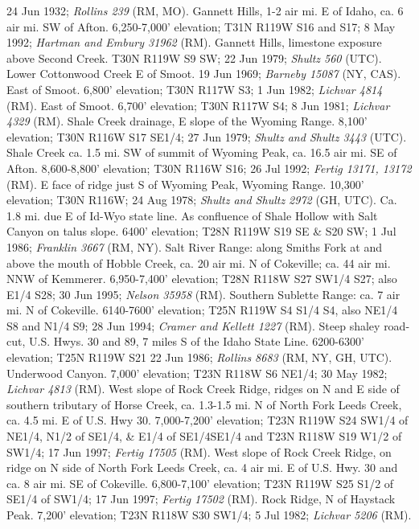 24 Jun 1932; \textit{Rollins 239} (RM, MO).
Gannett Hills, 1-2 air mi. E of Idaho, ca. 6 air mi. SW of Afton.
6,250-7,000' elevation; T31N R119W S16 and S17; 8 May 1992;
\textit{Hartman and Embury 31962} (RM).
Gannett Hills, limestone exposure above Second Creek. T30N R119W S9 SW;
22 Jun 1979; \textit{Shultz 560} (UTC).
Lower Cottonwood Creek E of Smoot. 19 Jun 1969;
\textit{Barneby 15087} (NY, CAS).
East of Smoot. 6,800' elevation; T30N R117W S3; 1 Jun 1982;
\textit{Lichvar 4814} (RM).
East of Smoot. 6,700' elevation; T30N R117W S4; 8 Jun 1981;
\textit{Lichvar 4329} (RM).
Shale Creek drainage, E slope of the Wyoming Range. 8,100' elevation;
T30N R116W S17 SE1/4; 27 Jun 1979; \textit{Shultz and Shultz 3443} (UTC).
Shale Creek ca. 1.5 mi. SW of summit of Wyoming Peak, ca. 16.5 air mi. SE of
Afton. 8,600-8,800' elevation; T30N R116W S16; 26 Jul 1992;
\textit{Fertig 13171, 13172} (RM).
E face of ridge just S of Wyoming Peak, Wyoming Range. 10,300' elevation;
T30N R116W; 24 Aug 1978; \textit{Shultz and Shultz 2972} (GH, UTC).
Ca. 1.8 mi. due E of Id-Wyo state line. As confluence of Shale Hollow with
Salt Canyon on talus slope. 6400' elevation; T28N R119W S19 SE & S20 SW;
1 Jul 1986; \textit{Franklin 3667} (RM, NY).
Salt River Range: along Smiths Fork at and above the mouth of Hobble Creek,
ca. 20 air mi. N of Cokeville; ca. 44 air mi. NNW of Kemmerer.
6,950-7,400' elevation; T28N R118W S27 SW1/4 S27; also E1/4 S28; 30 Jun 1995;
\textit{Nelson 35958} (RM).
Southern Sublette Range: ca. 7 air mi. N of Cokeville. 6140-7600' elevation;
T25N R119W S4 S1/4 S4, also NE1/4 S8 and N1/4 S9; 28 Jun 1994;
\textit{Cramer and Kellett 1227} (RM).
Steep shaley road-cut, U.S. Hwys. 30 and 89, 7 miles S of the Idaho State Line.
6200-6300' elevation; T25N R119W S21 22 Jun 1986;
\textit{Rollins 8683} (RM, NY, GH, UTC).
Underwood Canyon. 7,000' elevation; T23N R118W S6 NE1/4; 30 May 1982;
\textit{Lichvar 4813} (RM).
West slope of Rock Creek Ridge, ridges on N and E side of southern tributary of
Horse Creek, ca. 1.3-1.5 mi. N of North Fork Leeds Creek, ca. 4.5 mi. E of U.S.
Hwy 30. 7,000-7,200' elevation; T23N R119W S24 SW1/4 of NE1/4, N1/2 of SE1/4, &
E1/4 of SE1/4SE1/4 and T23N R118W S19 W1/2 of SW1/4; 17 Jun 1997;
\textit{Fertig 17505} (RM).
West slope of Rock Creek Ridge, on ridge on N side of North Fork Leeds Creek,
ca. 4 air mi. E of U.S. Hwy. 30 and ca. 8 air mi. SE of Cokeville.
6,800-7,100' elevation; T23N R119W S25 S1/2 of SE1/4 of SW1/4; 17 Jun 1997;
\textit{Fertig 17502} (RM).
Rock Ridge, N of Haystack Peak. 7,200' elevation; T23N R118W S30 SW1/4;
5 Jul 1982; \textit{Lichvar 5206} (RM).

